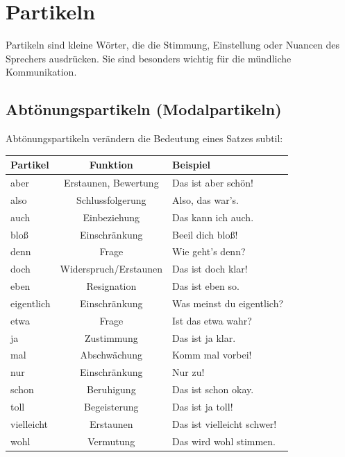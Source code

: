 \chapter{Partikeln}
\label{cha:Partikeln}

Partikeln sind kleine Wörter, die die Stimmung, Einstellung oder Nuancen des Sprechers ausdrücken. Sie sind besonders wichtig für die mündliche Kommunikation.

\section{Abtönungspartikeln (Modalpartikeln)}
\label{sec:Modalpartikeln}

Abtönungspartikeln verändern die Bedeutung eines Satzes subtil:

\begin{center}
\begin{tabular}{|l|c|l|}
\hline
\textbf{Partikel} & \textbf{Funktion} & \textbf{Beispiel} \\ \hline
aber & Erstaunen, Bewertung & Das ist aber schön! \\ \hline
also & Schlussfolgerung & Also, das war's. \\ \hline
auch & Einbeziehung & Das kann ich auch. \\ \hline
bloß & Einschränkung & Beeil dich bloß! \\ \hline
denn & Frage & Wie geht's denn? \\ \hline
doch & Widerspruch/Erstaunen & Das ist doch klar! \\ \hline
eben & Resignation & Das ist eben so. \\ \hline
eigentlich & Einschränkung & Was meinst du eigentlich? \\ \hline
etwa & Frage & Ist das etwa wahr? \\ \hline
ja & Zustimmung & Das ist ja klar. \\ \hline
mal & Abschwächung & Komm mal vorbei! \\ \hline
nur & Einschränkung & Nur zu! \\ \hline
schon & Beruhigung & Das ist schon okay. \\ \hline
toll & Begeisterung & Das ist ja toll! \\ \hline
vielleicht & Erstaunen & Das ist vielleicht schwer! \\ \hline
wohl & Vermutung & Das wird wohl stimmen. \\ \hline
\end{tabular}
\end{center}

